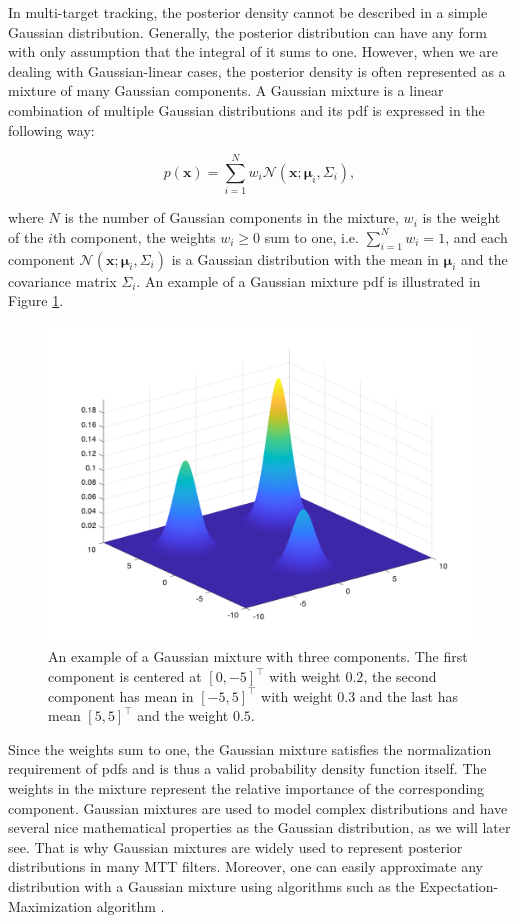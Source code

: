 In multi-target tracking, the posterior density cannot be described in a simple Gaussian distribution. Generally, the posterior distribution can have any form with only assumption that the integral of it sums to one. However, when we are dealing with Gaussian-linear cases, the posterior density is often represented as a mixture of many Gaussian components. A Gaussian mixture is a linear combination of multiple Gaussian distributions and its pdf is expressed in the following way:

\begin{equation}\label{eq:gaussian-mixture}
    p(\mathbf{x}) = \sum_{i=1}^N w_i \mathscr{N}\left(\mathbf{x}; \boldsymbol{\mu}_i, \Sigma_i\right),
\end{equation}

\noindent where $N$ is the number of Gaussian components in the mixture, $w_i$ is the weight of the $i$th component, the weights $w_i \geq 0$ sum to one, i.e. $\sum_{i=1}^N w_i = 1$, and each component $\mathscr{N}\left(\mathbf{x}; \boldsymbol{\mu}_i, \Sigma_i\right)$ is a Gaussian distribution with the mean in $\boldsymbol{\mu}_i$ and the covariance matrix $\Sigma_i$. An example of a Gaussian mixture pdf is illustrated in Figure \ref{fig:gaussian-mixture}.

\begin{figure}
\centering
  \includegraphics[width=.6\linewidth]{figures/gaussian-mixture.png}
  \caption[An example of a Gaussian mixture.]{An example of a Gaussian mixture with three components. The first component is centered at $[0, -5]^\intercal$ with weight $0.2$, the second component has mean in $[-5, 5]^\intercal$ with weight $0.3$ and the last has mean $[5, 5]^\intercal$ and the weight $0.5$.}
  \label{fig:gaussian-mixture}
\end{figure}

Since the weights sum to one, the Gaussian mixture satisfies the normalization requirement of pdfs and is thus a valid probability density function itself. The weights in the mixture represent the relative importance of the corresponding component. Gaussian mixtures are used to model complex distributions and have several nice mathematical properties as the Gaussian distribution, as we will later see. That is why Gaussian mixtures are widely used to represent posterior distributions in many MTT filters. Moreover, one can easily approximate any distribution with a Gaussian mixture using algorithms such as the Expectation-Maximization algorithm \cite{hastieElementsStatisticalLearning2001}.

